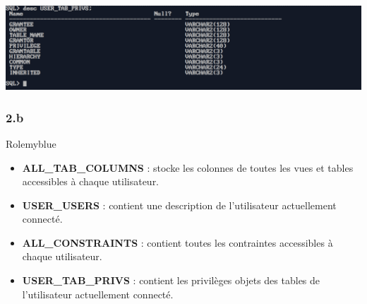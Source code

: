 \begin{center}
    \includegraphics[width=\textwidth]{ScreenShot/Partie5/desc4.png}
\end{center}


\subsubsection*{2.b}

\begin{prettyBox}{Role}{myblue}
\begin{itemize}
    \item \textbf{ALL\_TAB\_COLUMNS} : stocke les colonnes de toutes les vues et tables accessibles à chaque utilisateur.
    \item \textbf{USER\_USERS} : contient une description de l'utilisateur actuellement connecté.
    \item \textbf{ALL\_CONSTRAINTS} : contient toutes les contraintes accessibles à chaque utilisateur.
    \item \textbf{USER\_TAB\_PRIVS} : contient les privilèges objets des tables de l'utilisateur actuellement connecté.
\end{itemize}
\end{prettyBox}

